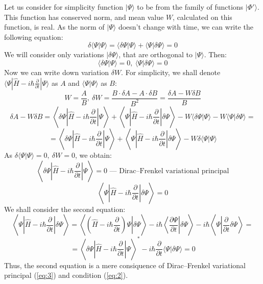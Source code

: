 Let us consider for simplicity function $|\Psi\rangle$ to be from the family of functions $|\Phi'\rangle$. 
This function has conserved norm, and mean value $W$, calculated on this function, is real.
As the norm of $|\Psi\rangle$ doesn't change with time, we can write the following equation:
$$\delta\langle\Psi|\Psi\rangle = \langle\delta\Psi|\Psi\rangle+\langle\Psi|\delta\Psi\rangle=0$$
We will consider only variations $|\delta\Psi\rangle$, that are orthogonal to $|\Psi\rangle$. Then:
\begin{equation}
\langle\delta\Psi|\Psi\rangle=0,\ \langle\Psi|\delta\Psi\rangle=0
\label{eq:2}
\end{equation}
Now we can write down variation $\delta W$. 
For simplicity, we shall denote $\langle\Psi|\hat{H}-i\hbar\frac{\partial}{\partial t}|\Psi\rangle$ as $A$ 
and $\langle\Psi|\Psi\rangle$ as $B$:
$$W = \frac{A}{B},\ \delta W = \frac{B\cdot\delta A - A\cdot\delta B}{B^2}=\frac{\delta A - W\delta B}{B}$$
$$\delta A - W\delta B = \left\langle\delta\Psi\left|\hat{H}-i\hbar\frac{\partial}{\partial t}\right|\Psi\right\rangle + %
			 \left\langle\Psi\left|\hat{H}-i\hbar\frac{\partial}{\partial t}\right|\delta\Psi\right\rangle - 
			 W\langle\delta\Psi|\Psi\rangle - W\langle\Psi|\delta\Psi\rangle = $$
$$ = \left\langle\delta\Psi\left|\hat{H}-i\hbar\frac{\partial}{\partial t}\right|\Psi\right\rangle + %
     \left\langle\Psi\left|\hat{H}-i\hbar\frac{\partial}{\partial t}\right|\delta\Psi\right\rangle - W\delta\langle\Psi|\Psi\rangle$$
As $\delta\langle\Psi|\Psi\rangle=0,\ \delta W = 0$, we obtain:
\begin{equation}
\left\langle\delta\Psi\left|\hat{H}-i\hbar\frac{\partial}{\partial t}\right|\Psi\right\rangle = 0\text{ --- Dirac--Frenkel variational principal}
\label{eq:3}
\end{equation}
$$\left\langle\Psi\left|\hat{H}-i\hbar\frac{\partial}{\partial t}\right|\delta\Psi\right\rangle = 0$$
We shall consider the second equation:
$$\left\langle\Psi\left|\hat{H}-i\hbar\frac{\partial}{\partial t}\right|\delta\Psi\right\rangle = %
  \left\langle\left.\left(\hat{H}-i\hbar\frac{\partial}{\partial t}\right)\Psi\right|\delta\Psi\right\rangle-%
  i\hbar\left.\left\langle\frac{\partial\Psi}{\partial t}\right|\delta\Psi\right\rangle-%
  i\hbar\left\langle\Psi\left|\frac{\partial}{\partial t}\delta\Psi\right\rangle\right.=$$
$$=\left\langle\delta\Psi\left|\hat{H}-i\hbar\frac{\partial}{\partial t}\right|\Psi\right\rangle^* -%
   i\hbar\frac{\partial}{\partial t}\langle\Psi|\delta\Psi\rangle = 0$$
Thus, the second equation is a mere consiquence of Dirac--Frenkel variational principal (\ref{eq:3}) and condition (\ref{eq:2}).

